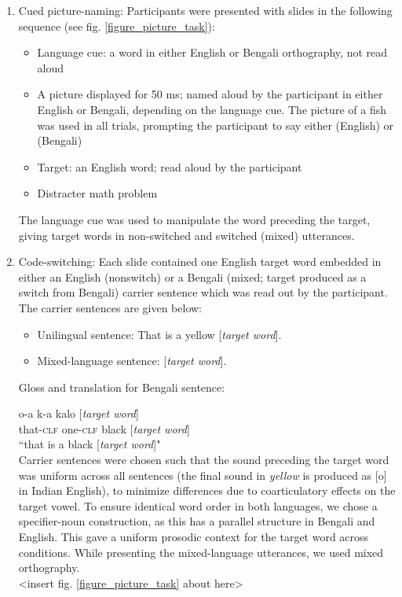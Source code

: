 \documentclass[12 pt]{article}
\newcommand{\nt}[1]{\textipa{[#1]}} %
\begin{document}
\begin{enumerate}[]
	\item Cued picture-naming: Participants were presented with slides in the following sequence (see fig. \ref{figure_picture_task}):
	\begin{itemize}
		\item Language cue: a word in either English or Bengali orthography, not read aloud
		\item A picture displayed for 50 ms; named aloud by the participant in either English or Bengali, depending on the language cue. The picture of a fish was used in all trials, prompting the participant to say either \nt{fIS} (English) or \nt{ma: \textteshlig \super{h}} (Bengali)
		\item Target: an English word; read aloud by the participant
		\item Distracter math problem
	\end{itemize}
	The language cue was used to manipulate the word preceding the target, giving target words in non-switched and switched (mixed) utterances. 
	
	\item Code-switching: Each slide contained one English target word embedded in either an English (nonswitch) or a Bengali (mixed; target produced as a switch from Bengali) carrier sentence which was read out by the participant. The carrier sentences are given below:
	\begin{itemize}
		\item Unilingual sentence: That is a yellow [\textit{target word}].
		\item Mixed-language sentence:  [\textit{target word}]. 
	\end{itemize}
	
Gloss and translation for Bengali sentence:

o-a \qquad \textipa{\ae}k-a \quad kalo [\textit{target word}]\\
that-\textsc{clf}  one-\textsc{clf}  black [\textit{target word}]\\
``that is a black [\textit{target word}]"\\
	
Carrier sentences were chosen such that the sound preceding the target word was uniform across all sentences (the final sound in \textit{yellow} is produced as [o] in Indian English), to minimize differences due to coarticulatory effects on the target vowel. To ensure identical word order in both languages, we chose a specifier-noun construction, as this has a parallel structure in Bengali and English. This gave a uniform prosodic context for the target word across conditions. While presenting the mixed-language utterances, we used mixed orthography. \\

<insert fig. \ref{figure_picture_task} about here>
	
\end{enumerate}
\end{document}

